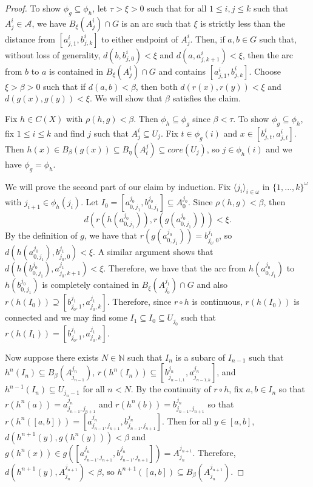 \documentclass[10pt,a4paper]{amsart}
\numberwithin{equation}{section}
\begin{document}
\begin{proof}
To show $\phi_g\subseteq \phi_h$, let $\tau>\xi >0$ such that for all $1\leq i,j\leq k$ such that $A^i_j\in \mathcal{A}$, we have $B_\xi(A^i_j)\cap G$ is an arc such that $\xi$ is strictly less than the distance from $[a_{j,1}^i, b_{j,k}^i]$ to either endpoint of $A_j^i$. Then, if $a,b\in G$ such that, without loss of generality, $d(b, b_{j,0}^i)<\xi$ and $d(a,a_{j,k+1}^i )<\xi$, then the arc from $b$ to $a$ is contained in $B_\xi(A_j^i)\cap G$ and contains $[a_{j,1}^i, b_{j,k}^i]$. Choose $\xi>\beta>0$ such that if $d(a,b)<\beta$, then both $d(r(x),r(y))<\xi$ and $d(g(x),g(y))<\xi$. We will show that $\beta$ satisfies the claim. 

Fix $h\in C(X)$ with $\rho(h,g)<\beta$. Then $\phi_h\subseteq\phi_g$ since $\beta<\tau$. To show $\phi_g\subseteq\phi_h$, fix $1\leq i\leq k$ and find $j$ such that $A_j^i\subseteq U_j$. Fix $t\in \phi_g(i)$ and $x\in [b_{j,t}^i,a_{j,t}^i].$ Then $h(x) \in B_\beta(g(x))\subseteq B_\eta(A_t^j)\subseteq core(U_j)$, so $j\in \phi_h(i)$ and we have $\phi_g=\phi_h$.

We will prove the second part of our claim by induction. Fix $\langle j_i\rangle_{i\in \omega} $ in $\{1,...,k\}^\omega$ with $j_{i+1}\in \phi_h(j_i)$. Let $I_0= [a_{0,j_1}^{j_0}, b_{0,j_1}^{j_0}] \subseteq A_0^{j_0}.$ Since $\rho(h,g)<\beta$, then $$d(r(h(a_{0,j_1}^{j_0})), r(g(a_{0,j_1}^{j_0})))  <\xi.$$  By the definition of $g$, we have that $ r(g(a_{0,j_1}^{j_0}))=b_{j_0,0}^{j_1}$, so $d(h(a_{0,j_1}^{j_0}),b_{j_0,0}^{j_1})<\xi.$ A similar argument shows that $d(h(b_{0,j_1}^{j_0}), a^{j_1}_{j_0,k+1})<\xi.$ Therefore, we have that the arc from $h(a_{0,j_1}^{j_0})$ to $h(b_{0,j_1}^{j_0})$ is completely contained in $B_\xi (A^{j_1}_{j_0})\cap G$ and also $r(h(I_0))\supseteq [b_{j_0,1}^{j_1},a^{j_1}_{j_0,k}]$. Therefore, since $r\circ h$ is continuous, $r(h(I_0))$ is connected and we may find some $I_1\subseteq I_0\subseteq U_{j_0}$ such that $r(h(I_1))= [b_{j_0,1}^{j_1},a^{j_1}_{j_0,k}]$.

Now suppose there exists $N\in \mathbb{N}$ such that $I_n$ is a subarc of $I_{n-1}$ such that $h^n(I_n)\subseteq B_\beta(A_{j_{n-1}}^{j_n})$, $r(h^n(I_n))\subseteq [b_{j_{n-1,1}}^{j_n},a_{j_{n-1,k}}^{j_n}]$, and $h^{n-1}(I_n)\subseteq U_{j_n-1}$ for all $n<N$. By the continuity of $r\circ h$, fix $a,b\in I_n$ so that $r(h^n(a))= a^{j_n}_{j_{n-1}, j_{n+1}} $ and $r(h^n(b))= b^{j_n}_{j_{n-1}, j_{n+1}} $ so that $r(h^n([a,b]))= [a^{j_n}_{j_{n-1}, j_{n+1}} ,b^{j_n}_{j_{n-1}, j_{n+1}} ]$. Then for all $y\in [a,b] $, $d(h^{n+1}(y),g(h^n(y)))<\beta$ and $g(h^n(x))\in g([a^{j_n}_{j_{n-1}, j_{n+1}} ,b^{j_n}_{j_{n-1}, j_{n+1}} ])= A^{j_{n+1}}_{j_n}.$ Therefore, $d(h^{n+1}(y),A^{j_{n+1}}_{j_{n}})<\beta $, so $h^{n+1}([a,b])\subseteq B_\beta(A^{j_{n+1}}_{j_n}).$


\end{proof}
\end{document}
